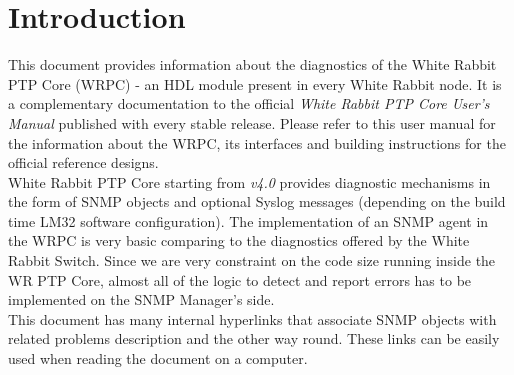 \section{Introduction}

This document provides information about the diagnostics of the White Rabbit
PTP Core (WRPC) - an HDL module present in every White Rabbit node. It is a
complementary documentation to the official \emph{White Rabbit PTP Core User's
Manual} published with every stable release. Please refer to this user manual
for the information about the WRPC, its interfaces and building instructions for
the official reference designs.\\

White Rabbit PTP Core starting from \emph{v4.0} provides diagnostic mechanisms
in the form of SNMP objects and optional Syslog messages (depending on the build
time LM32 software configuration). The implementation of an SNMP agent in the
WRPC is very basic comparing to the diagnostics offered by the White Rabbit
Switch. Since we are very constraint on the code size running inside the WR PTP
Core, almost all of the logic to detect and report errors has to be implemented
on the SNMP Manager's side.\\

This document has many internal hyperlinks that associate SNMP objects with
related problems description and the other way round. These links can be easily
used when reading the document on a computer.
